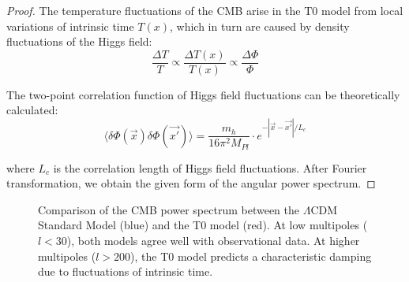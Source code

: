 \documentclass{article}
\theoremstyle{definition}
\theoremstyle{remark}
\newcommand{\Tfield}{T(x)} %
\begin{document}
	\begin{proof}
		The temperature fluctuations of the CMB arise in the T0 model from local variations of intrinsic time $\Tfield$, which in turn are caused by density fluctuations of the Higgs field:
		\begin{equation}
			\frac{\Delta T}{T} \propto \frac{\Delta \Tfield}{\Tfield} \propto \frac{\Delta \Phi}{\Phi}
		\end{equation}
		
		The two-point correlation function of Higgs field fluctuations can be theoretically calculated:
		\begin{equation}
			\langle \delta\Phi(\vec{x}) \delta\Phi(\vec{x'}) \rangle = \frac{m_h}{16\pi^2 M_{Pl}} \cdot e^{-|\vec{x}-\vec{x'}|/L_c}
		\end{equation}
		
		where $L_c$ is the correlation length of Higgs field fluctuations. After Fourier transformation, we obtain the given form of the angular power spectrum.
	\end{proof}
	
	\begin{figure}[h]
		\centering
		\caption{Comparison of the CMB power spectrum between the $\Lambda$CDM Standard Model (blue) and the T0 model (red). At low multipoles ($l < 30$), both models agree well with observational data. At higher multipoles ($l > 200$), the T0 model predicts a characteristic damping due to fluctuations of intrinsic time.}
		\label{fig:cmb-spectrum}
	\end{figure}
	
\end{document}
